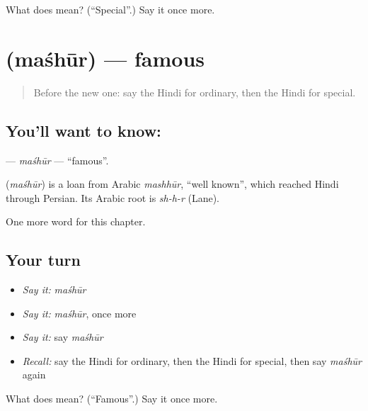 \begin{tcolorbox}[breakable,colback=teal!4,colframe=teal!35!black,title={Before you move on}]
What does  mean? (\textquotedblleft{}Special\textquotedblright{}.) Say it once more.
\end{tcolorbox}
\section[\texorpdfstring{\hi{मशहूर} (maśhūr)}{मशहूर (maśhūr)}]{ (maśhūr) — famous}

\label{lesson:HI-C242-mashur}



\begin{quote}
Before the new one: say the Hindi for ordinary, then the Hindi for special.
\end{quote}

\subsection*{You'll want to know: }
\textbf{} — \emph{maśhūr} — \textquotedblleft{}famous\textquotedblright{}.

\begin{cousinweb}
\textbf{} (\emph{maśhūr}) is a loan from Arabic \emph{mashhūr}, \textquotedblleft{}well known\textquotedblright{}, which reached Hindi through Persian. Its Arabic root is \emph{sh-h-r} (Lane).
\end{cousinweb}

\begin{grammarlens}[title={What you've built}]
One more word for this chapter.
\end{grammarlens}

\subsection*{Your turn}
\begin{itemize}
\raggedright
  \item \emph{Say it:} \emph{maśhūr}
  \item \emph{Say it:} \emph{maśhūr}, once more
  \item \emph{Say it:} say \emph{maśhūr}
  \item \emph{Recall:} say the Hindi for ordinary, then the Hindi for special, then say \emph{maśhūr} again
\end{itemize}

\begin{tcolorbox}[breakable,colback=teal!4,colframe=teal!35!black,title={Before you move on}]
What does  mean? (\textquotedblleft{}Famous\textquotedblright{}.) Say it once more.
\end{tcolorbox}
